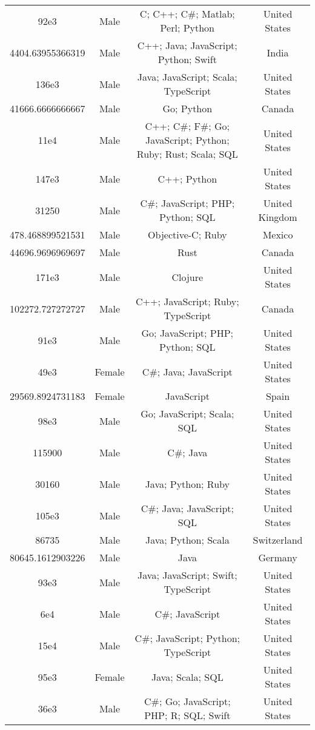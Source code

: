 \begin{center}
\begin{tabular}{ |c|c|c|c| }
92e3  &  Male  &  C; C++; C\#; Matlab; Perl; Python  &  United States  \\ 
4404.63955366319  &  Male  &  C++; Java; JavaScript; Python; Swift  &  India  \\ 
136e3  &  Male  &  Java; JavaScript; Scala; TypeScript  &  United States  \\ 
41666.6666666667  &  Male  &  Go; Python  &  Canada  \\ 
11e4  &  Male  &  C++; C\#; F\#; Go; JavaScript; Python; Ruby; Rust; Scala; SQL  &  United States  \\ 
147e3  &  Male  &  C++; Python  &  United States  \\ 
31250  &  Male  &  C\#; JavaScript; PHP; Python; SQL  &  United Kingdom  \\ 
478.468899521531  &  Male  &  Objective-C; Ruby  &  Mexico  \\ 
44696.9696969697  &  Male  &  Rust  &  Canada  \\ 
171e3  &  Male  &  Clojure  &  United States  \\ 
102272.727272727  &  Male  &  C++; JavaScript; Ruby; TypeScript  &  Canada  \\ 
91e3  &  Male  &  Go; JavaScript; PHP; Python; SQL  &  United States  \\ 
49e3  &  Female  &  C\#; Java; JavaScript  &  United States  \\ 
29569.8924731183  &  Female  &  JavaScript  &  Spain  \\ 
98e3  &  Male  &  Go; JavaScript; Scala; SQL  &  United States  \\ 
115900  &  Male  &  C\#; Java  &  United States  \\ 
30160  &  Male  &  Java; Python; Ruby  &  United States  \\ 
105e3  &  Male  &  C\#; Java; JavaScript; SQL  &  United States  \\ 
86735  &  Male  &  Java; Python; Scala  &  Switzerland  \\ 
80645.1612903226  &  Male  &  Java  &  Germany  \\ 
93e3  &  Male  &  Java; JavaScript; Swift; TypeScript  &  United States  \\ 
6e4  &  Male  &  C\#; JavaScript  &  United States  \\ 
15e4  &  Male  &  C\#; JavaScript; Python; TypeScript  &  United States  \\ 
95e3  &  Female  &  Java; Scala; SQL  &  United States  \\ 
36e3  &  Male  &  C\#; Go; JavaScript; PHP; R; SQL; Swift  &  United States  \\ 

\end{tabular}
\end{center}
